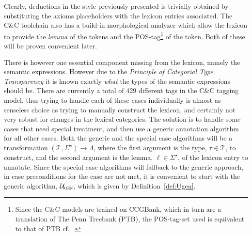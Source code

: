 Clearly, deductions in the style previously presented is trivially obtained by substituting the axioms placeholders with the lexicon entries associated. The C\&C toolchain also has a build-in morphological analyzer which allow the lexicon to provide the \emph{lemma} of the tokens and the POS-tag\footnote{Since the C\&C models are trained on CCGBank, which in turn are a translation of The Penn Treebank (PTB), the POS-tag-set used is equivalent to that of PTB cf.\ \cite{pennTreebank}.} of the token. Both of these will be proven convenient later.

There is however one essential component missing from the lexicon, namely the semantic expressions. However due to the \emph{Principle of Categorial Type Transparency} it is known exactly \emph{what} the types of the semantic expressions should be. There are currently a total of 429 different tags in the C\&C tagging model, thus trying to handle each of these cases individually is almost as senseless choice as trying to manually construct the lexicon, and certainly not very robust for changes in the lexical categories. The solution is to handle some cases that need special treatment, and then use a generic annotation algorithm for all other cases. Both the generic and the special case algorithms will be a transformation $(\mathcal{T}, \Sigma^\star) \to \Lambda$, where the first argument is the type, $\tau \in \mathcal{T}$, to construct, and the second argument is the lemma, $\ell \in \Sigma^\star$, of the lexicon entry to annotate. Since the special case algorithms will fallback to the generic approach, in case preconditions for the case are not met, it is convenient to start with the generic algorithm, $\mathcal{U}_\textsc{gen}$, which is given by Definition~\ref{def:Ugen}.

